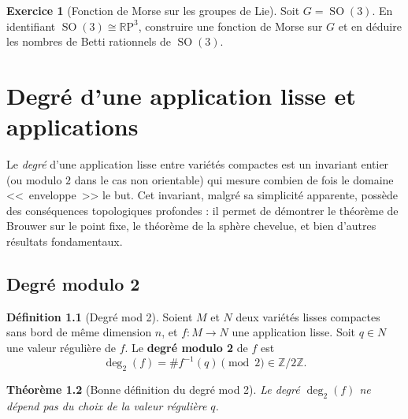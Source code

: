 \documentclass[12pt,a4paper,openany]{book}
\theoremstyle{definition}
\newtheorem{definition}{Définition}[chapter]
\newtheorem{exercice}{Exercice}[chapter]
\theoremstyle{plain}
\newtheorem{theoreme}[definition]{Théorème}
\theoremstyle{remark}
\newcommand{\Z}{\mathbb{Z}}
\newcommand{\RP}{\mathbb{R}\mathrm{P}}
\DeclareMathOperator{\SO}{SO}
\begin{document}
\begin{exercice}[Fonction de Morse sur les groupes de Lie]\label{exo:morse-11}
Soit $G = \SO(3)$. En identifiant $\SO(3) \cong \RP^3$, construire une fonction
de Morse sur $G$ et en déduire les nombres de Betti rationnels de $\SO(3)$.
\end{exercice}


\chapter{Degré d'une application lisse et applications}\label{chap:degre}
\minitoc

\vspace{1cm}

Le \emph{degré} d'une application lisse entre variétés compactes est un invariant
entier (ou modulo $2$ dans le cas non orientable) qui mesure combien de fois le
domaine <<~enveloppe~>> le but. Cet invariant, malgré sa simplicité apparente,
possède des conséquences topologiques profondes : il permet de démontrer le
théorème de Brouwer sur le point fixe, le théorème de la sphère chevelue, et
bien d'autres résultats fondamentaux.

\section{Degré modulo 2}\label{sec:degre-mod2}

\begin{definition}[Degré mod 2]\label{def:degre-mod2}
Soient $M$ et $N$ deux variétés lisses compactes sans bord de même dimension $n$,
et $f : M \to N$ une application lisse. Soit $q \in N$ une valeur
régulière de $f$. Le \textbf{degré modulo 2} de $f$ est
\[
  \deg_2(f) = \#f^{-1}(q) \pmod{2} \in \Z/2\Z.
\]
\end{definition}

\begin{theoreme}[Bonne définition du degré mod 2]\label{thm:degre-mod2-bdef}
Le degré $\deg_2(f)$ ne dépend pas du choix de la valeur régulière $q$.
\end{theoreme}
\end{document}
